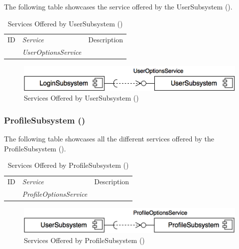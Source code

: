\documentclass[12pt,letterpaper]{article}
\begin{document}
\noindent{}
The following table showcases the service offered by the UserSubsystem ().

\begin{table}[H]
	\caption{Services Offered by UserSubsystem ()} 
	\begin{tabu} to 
		\tableheader{}ID & Service & Description\\
		 & UserOptionsService & \\
	\end{tabu}
\end{table}

\begin{figure}[H]
	\centering{}
	\includegraphics[scale=0.40]{imgs/d3/services/user-subsystem.png}
	\caption{Services Offered by UserSubsystem ()}
\end{figure}

\subsubsection{ProfileSubsystem ()}

\noindent{}
The following table showcases all the different services offered by the ProfileSubsystem ().

\begin{table}[H]
	\caption{Services Offered by ProfileSubsystem ()} 
	\begin{tabu} to 
		\tableheader{}ID & Service & Description\\
		 & ProfileOptionsService & \\
	\end{tabu}
\end{table}

\begin{figure}[H]
	\centering{}
	\includegraphics[scale=0.40]{imgs/d3/services/profile-subsystem.png}
	\caption{Services Offered by ProfileSubsystem ()}
\end{figure}
\end{document}
